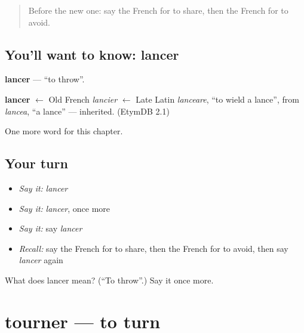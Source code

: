 \label{lesson:FR-C179-lancer}



\begin{quote}
Before the new one: say the French for to share, then the French for to avoid.
\end{quote}

\subsection*{You'll want to know: lancer}
\textbf{lancer} — \textquotedblleft{}to throw\textquotedblright{}.

\begin{cousinweb}
\textbf{lancer} $\leftarrow$ Old French \emph{lancier} $\leftarrow$ Late Latin \emph{lanceare}, \textquotedblleft{}to wield a lance\textquotedblright{}, from \emph{lancea}, \textquotedblleft{}a lance\textquotedblright{} — inherited. (EtymDB 2.1)
\end{cousinweb}

\begin{grammarlens}[title={What you've built}]
One more word for this chapter.
\end{grammarlens}

\subsection*{Your turn}
\begin{itemize}
\raggedright
  \item \emph{Say it:} \emph{lancer}
  \item \emph{Say it:} \emph{lancer}, once more
  \item \emph{Say it:} say \emph{lancer}
  \item \emph{Recall:} say the French for to share, then the French for to avoid, then say \emph{lancer} again
\end{itemize}

\begin{tcolorbox}[breakable,colback=teal!4,colframe=teal!35!black,title={Before you move on}]
What does lancer mean? (\textquotedblleft{}To throw\textquotedblright{}.) Say it once more.
\end{tcolorbox}
\section[tourner]{tourner — to turn}

\label{lesson:FR-C179-tourner}



